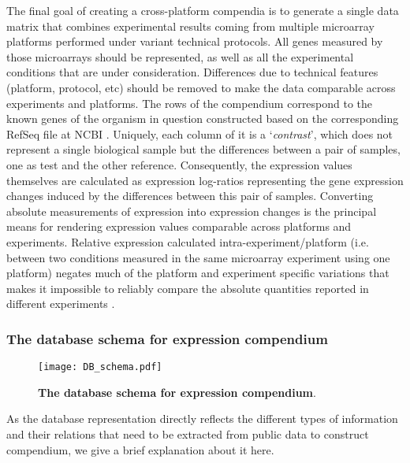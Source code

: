 The final goal of creating a cross-platform compendia is to generate a single
data matrix that combines experimental results coming from multiple microarray
platforms performed under variant technical protocols.  All genes measured by
those microarrays should be represented, as well as all the experimental
conditions that are under consideration.  Differences due to technical features
(platform, protocol, etc) should be removed to make the data comparable across
experiments and platforms.
%
The rows of the compendium correspond to the known genes of the organism in
question constructed based on the corresponding RefSeq file at NCBI
\cite{Pruitt2007}.
%
Uniquely, each column of it is a `\textit{contrast}', which does not represent
a single biological sample but the differences between a pair of samples, one as
test and the other reference.
%
Consequently, the expression values themselves are calculated as expression
log-ratios representing the gene expression changes induced by the differences
between this pair of samples.
%
Converting absolute measurements of expression into expression changes is the
principal means for rendering expression values comparable across platforms and
experiments.
%
Relative expression calculated intra-experiment/platform (i.e. between two
conditions measured in the same microarray experiment using one platform)
negates much of the platform and experiment specific variations that makes it
impossible to reliably compare the absolute quantities reported in different
experiments \cite{Shi2006}.



\subsubsection{The database schema for expression compendium}\label{sec:command-db-schema}

\begin{figure}
  \centering
  \texttt{[image: DB\_schema.pdf]}
  \caption[The database schema for expression compendium]{ \textbf{The
      database schema for expression compendium}.
  }
  \label{fig:comp-db-schema}
\end{figure}

As the database representation directly reflects the different types of
information and their relations that need to be extracted from public data to
construct compendium, we give a brief explanation about it here.

